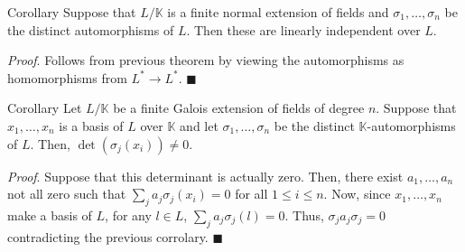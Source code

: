 \documentclass[9pt]{beamer}
\begin{document}
\begin{frame}
  \begin{block}{Corollary}
    Suppose that $L/\mathbb{K}$ is a finite normal extension of fields and $\sigma_1,\ldots, \sigma_n$ be the distinct automorphisms of $L$. Then these are linearly independent over $L$.
  \end{block}

  \textit{Proof}. Follows from previous theorem by viewing the automorphisms as homomorphisms from $L^*\to L^*$. \hfill $\blacksquare$

  \begin{block}{Corollary}
    Let $L/\mathbb{K}$ be a finite Galois extension of fields of degree $n$. Suppose that $x_1,\ldots, x_n$ is a basis of $L$ over $\mathbb{K}$ and let $\sigma_1, \ldots, \sigma_n$ be the distinct $\mathbb{K}$-automorphisms of $L$. Then, $\det(\sigma_j(x_i)) \neq 0$.
  \end{block}
  \textit{Proof}. Suppose that this determinant is actually zero. Then, there exist $a_1,\ldots, a_n$ not all zero such that $\sum_{j}a_j\sigma_j(x_i) = 0$ for all $1\leq i\leq n$.
  Now, since $x_1,\ldots, x_n$ make a basis of $L$, for any $l\in L$, $\sum_{j}a_j \sigma_j(l) = 0$. Thus, $\sigma_j a_j \sigma_j = 0$ contradicting the previous corrolary. \hfill $\blacksquare$

\end{frame}
\end{document}
